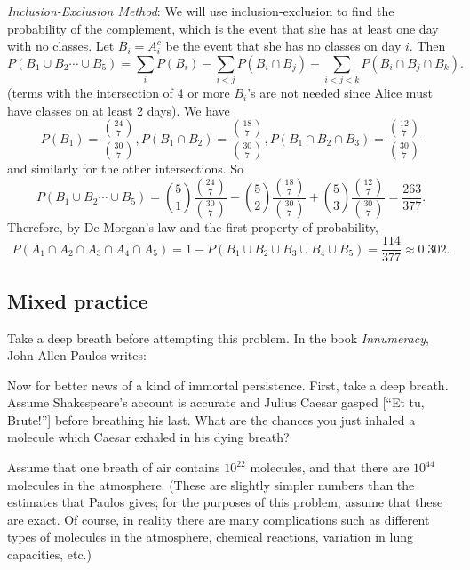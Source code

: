 {\begin{Solution}
        \textit{Inclusion-Exclusion Method}: We will use inclusion-exclusion to find the probability of the complement, which is the event that she has at least one day with no classes. 
        Let $B_i = A_i^c$ be the event that she has no classes on day $i$. 
        Then 
        \begin{equation*}
            P(B_1 \cup B_2 \cdots \cup B_5) = \sum_i P(B_i) - \sum_{i < j} P(B_i \cap B_j) + \sum_{i < j < k} P(B_i \cap B_j \cap B_k). 
        \end{equation*}
        (terms with the intersection of 4 or more $B_i$'s are not needed since Alice must have classes on at least 2 days). 
        We have 
        \begin{equation*}
            P(B_1) = \frac{\binom{24}{7}}{\binom{30}{7}}, P(B_1 \cap B_2) = \frac{\binom{18}{7}}{\binom{30}{7}}, P(B_1 \cap B_2 \cap B_3) = \frac{\binom{12}{7}}{\binom{30}{7}} 
        \end{equation*}
        and similarly for the other intersections. So 
        \begin{equation*}
            P(B_1 \cup B_2 \cdots \cup B_5) = \binom{5}{1} \frac{\binom{24}{7}}{\binom{30}{7}} - \binom{5}{2} \frac{\binom{18}{7}}{\binom{30}{7}} + \binom{5}{3} \frac{\binom{12}{7}}{\binom{30}{7}} = \frac{263}{377}. 
        \end{equation*}
        Therefore, by De Morgan's law and the first property of probability, 
        \begin{equation*}
            P(A_1 \cap A_2 \cap A_3 \cap A_4 \cap A_5) = 1 - P(B_1 \cup B_2 \cup B_3 \cup B_4 \cup B_5) = \frac{114}{377} \approx 0.302. 
        \end{equation*}
    \end{Solution}
    \item%
    \subsection{Mixed practice} 
    \item%
    \item%
    Take a deep breath before attempting this problem. 
    In the book \textit{Innumeracy}, John Allen Paulos writes: 
    \begin{center}
        \begin{minipage}{\dimexpr\textwidth-8em\relax}
        Now for better news of a kind of immortal persistence. 
        First, take a deep breath. 
        Assume Shakespeare's account is accurate and Julius Caesar gasped [``Et tu, Brute!''] before breathing his last. 
        What are the chances you just inhaled a molecule which Caesar exhaled in his dying breath? 
        \end{minipage}
    \end{center}
    Assume that one breath of air contains $10^{22}$ molecules, and that there are $10^{44}$ molecules in the atmosphere. 
    (These are slightly simpler numbers than the estimates that Paulos gives; for the purposes of this problem, assume that these are exact. 
    Of course, in reality there are many complications such as different types of molecules in the atmosphere, chemical reactions, variation in lung capacities, etc.) 

}
